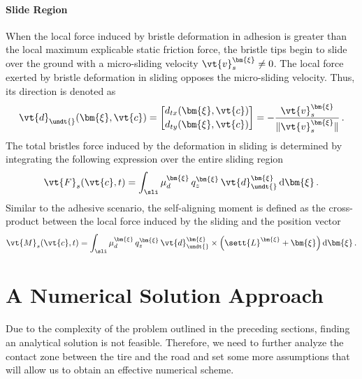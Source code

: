 \paragraph{Slide Region}

When the local force induced by bristle deformation in adhesion is greater than the local maximum explicable static friction force, the bristle tips begin to slide over the ground with a micro-sliding velocity $\vt{v}_s^{\bm{\xi}} \neq 0$. The local force exerted by bristle deformation in sliding opposes the micro-sliding velocity. Thus, its direction is denoted as
%
\begin{equation*}
  \vt{d}_{\undt{}}(\bm{\xi},\vt{c}) =
  \begin{bmatrix}
    d_{tx}(\bm{\xi},\vt{c}) \\[0.2em]
    d_{ty}(\bm{\xi},\vt{c})
  \end{bmatrix} = -\dfrac{\vt{v}_s^{\bm{\xi}}}{\|{\vt{v}_s^{\bm{\xi}}}\|} \, \text{.}
\end{equation*}
%
The total bristles force induced by the deformation in sliding is determined by integrating the following expression over the entire sliding region \sli{}
%
\begin{equation}
  \vt{F}_s(\vt{c},t) = \int_{\sli} \mu_d^{\bm{\xi}}\,q_z^{\bm{\xi}}\,\vt{d}_{\undt{}}^{\bm{\xi}} \, \mathrm{d}\bm{\xi} \, \text{.}
  \label{app3:eq:F_s}
\end{equation}
%
Similar to the adhesive scenario, the self-aligning moment is defined as the cross-product between the local force induced by the sliding and the position vector
%
\begin{equation}
  \vt{M}_s(\vt{c},t) = \int_{\sli} \mu_d^{\bm{\xi}}\,q_z^{\bm{\xi}}\,\vt{d}_{\undt{}}^{\bm{\xi}} \times \left(\sett{L}^{\bm{\xi}} + \bm{\xi}\right) \mathrm{d}\bm{\xi} \, \text{.}
  \label{app3:eq:M_s}
\end{equation}


\section{A Numerical Solution Approach}
\label{app3:sec:numerical_solution}

Due to the complexity of the problem outlined in the preceding sections, finding an analytical solution is not feasible. Therefore, we need to further analyze the contact zone between the tire and the road and set some more assumptions that will allow us to obtain an effective numerical scheme.

